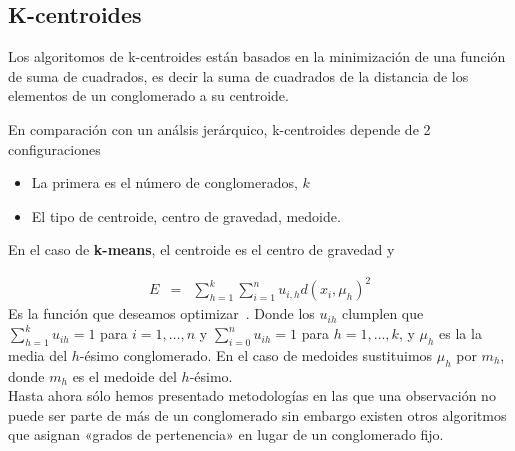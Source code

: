 \documentclass[12pt,oneside]{book}
\begin{document}
\subsection{K-centroides} %
\label{sub:k_centroides}
Los algoritomos de k-centroides est\'an basados en la minimizaci\'on de una funci\'on de suma de cuadrados, es decir la suma de cuadrados de la distancia de los elementos de un conglomerado a su centroide.

En comparaci\'on con un an\'alsis jer\'arquico, k-centroides depende de 2 configuraciones
\begin{itemize}
	\item La primera es el n\'umero de conglomerados, $k$
	\item El tipo de centroide, centro de gravedad, medoide.
\end{itemize}
 
 En el caso de \textbf{k-means}, el centroide es el centro de gravedad y  

 $$
\begin{array}{ccc}
E &=& \sum_{h=1}^k \sum_{i=1}^n u_{i,h} d(x_i, \mu_h)^2
\end{array}
$$
Es la funci\'on que deseamos optimizar~\cite{CLUSTERING_1}. Donde los $u_{ih}$ clumplen que $\sum_{h=1}^k u_{ih}=1$ para $i = 1, \dots, n$ y $\sum_{i=0}^n u_{ih}=1$ para $h = 1, \dots, k$, y $\mu_h$ es la la media del $h$-\'esimo conglomerado. En el caso de medoides sustituimos $\mu_h$ por $m_h$, donde $m_h$ es el medoide del $h$-\'esimo.\\

Hasta ahora s\'olo hemos presentado metodolog\'ias en las que una observaci\'on no puede ser parte de m\'as de un conglomerado sin embargo existen otros algoritmos que asignan «grados de pertenencia» en lugar de un conglomerado fijo.
\end{document}
